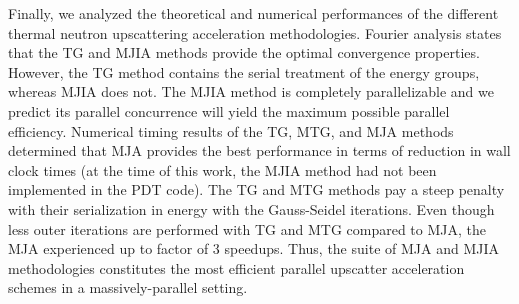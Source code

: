 Finally, we analyzed the theoretical and numerical performances of the different thermal neutron upscattering acceleration methodologies. Fourier analysis states that the TG and MJIA methods provide the optimal convergence properties. However, the TG method contains the serial treatment of the energy groups, whereas MJIA does not. The MJIA method is completely parallelizable and we predict its parallel concurrence will yield the maximum possible parallel efficiency. Numerical timing results of the TG, MTG, and MJA methods determined that MJA provides the best performance in terms of reduction in wall clock times (at the time of this work, the MJIA method had not been implemented in the PDT code). The TG and MTG methods pay a steep penalty with their serialization in energy with the Gauss-Seidel iterations. Even though less outer iterations are performed with TG and MTG compared to MJA, the MJA experienced up to factor of 3 speedups. Thus, the suite of MJA and MJIA methodologies constitutes the most efficient parallel upscatter acceleration schemes in a massively-parallel setting.

